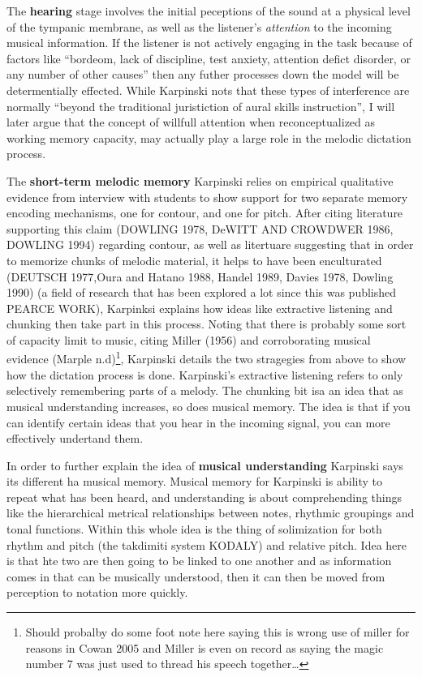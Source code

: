 \documentclass[]{book}
\let\rmarkdownfootnote\footnote%
\def\footnote{\protect\rmarkdownfootnote}
\theoremstyle{definition}
\theoremstyle{definition}
\theoremstyle{definition}
\theoremstyle{remark}
\begin{document}
The \textbf{hearing} stage involves the initial peceptions of the sound
at a physical level of the tympanic membrane, as well as the listener's
\emph{attention} to the incoming musical information. If the listener is
not actively engaging in the task because of factors like ``bordeom,
lack of discipline, test anxiety, attention defict disorder, or any
number of other causes'' then any futher processes down the model will
be determentially effected. While Karpinski nots that these types of
interference are normally ``beyond the traditional juristiction of aural
skills instruction'', I will later argue that the concept of willfull
attention when reconceptualized as working memory capacity, may actually
play a large role in the melodic dictation process.

The \textbf{short-term melodic memory} Karpinski relies on empirical
qualitative evidence from interview with students to show support for
two separate memory encoding mechanisms, one for contour, and one for
pitch. After citing literature supporting this claim (DOWLING 1978,
DeWITT AND CROWDWER 1986, DOWLING 1994) regarding contour, as well as
litertuare suggesting that in order to memorize chunks of melodic
material, it helps to have been enculturated (DEUTSCH 1977,Oura and
Hatano 1988, Handel 1989, Davies 1978, Dowling 1990) (a field of
research that has been explored a lot since this was published PEARCE
WORK), Karpinksi explains how ideas like extractive listening and
chunking then take part in this process. Noting that there is probably
some sort of capacity limit to music, citing Miller (1956) and
corroborating musical evidence (Marple n.d)\footnote{Should probalby do
  some foot note here saying this is wrong use of miller for reasons in
  Cowan 2005 and Miller is even on record as saying the magic number 7
  was just used to thread his speech together\ldots{}}, Karpinski
details the two stragegies from above to show how the dictation process
is done. Karpinski's extractive listening refers to only selectively
remembering parts of a melody. The chunking bit isa an idea that as
musical understanding increases, so does musical memory. The idea is
that if you can identify certain ideas that you hear in the incoming
signal, you can more effectively undertand them.

In order to further explain the idea of \textbf{musical understanding}
Karpinski says its different ha musical memory. Musical memory for
Karpinski is ability to repeat what has been heard, and understanding is
about comprehending things like the hierarchical metrical relationships
between notes, rhythmic groupings and tonal functions. Within this whole
idea is the thing of solimization for both rhythm and pitch (the
takdimiti system KODALY) and relative pitch. Idea here is that hte two
are then going to be linked to one another and as information comes in
that can be musically understood, then it can then be moved from
perception to notation more quickly.
\end{document}
